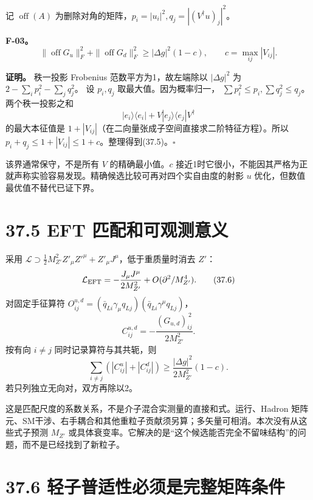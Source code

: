 \documentclass[
  11pt,
  oneside]{book}
\begin{document}
记 \(\operatorname{off}(A)\)
为删除对角的矩阵，\(p_i=|u_i|^2,q_j=|(V^\dagger u)_j|^2\)。

\protect\hypertarget{f-03}{}{}

\textbf{F-03。} \[
\|\operatorname{off}G_u\|_F^2+
\|\operatorname{off}G_d\|_F^2
\ge |\Delta g|^2(1-c),\qquad c=\max_{ij}|V_{ij}|.
\tag{37.5}
\]

\textbf{证明。} 秩一投影 Frobenius 范数平方为1，故左端除以
\(|\Delta g|^2\) 为 \(2-\sum_i p_i^2-\sum_jq_j^2\)。 设 \(p_i,q_j\)
取最大值。因为概率归一， \(\sum p_i^2\le p_i,\sum q_j^2\le q_j\)。
两个秩一投影之和 \[
|e_i\rangle\langle e_i|+
V|e_j\rangle\langle e_j|V^\dagger
\] 的最大本征值是
\(1+|V_{ij}|\)（在二向量张成子空间直接求二阶特征方程）。所以
\(p_i+q_j\le1+|V_{ij}|\le1+c\)。整理得到(37.5)。\(\square\)

该界通常保守，不是所有 \(V\) 的精确最小值。\(c\)
接近1时它很小，不能因其严格为正就声称实验容易发现。精确候选比较可再对四个实自由度的射影
\(u\) 优化，但数值最优值不替代已证下界。

\hypertarget{eft-ux5339ux914dux548cux53efux89c2ux6d4bux610fux4e49}{%
\section{37.5 EFT
匹配和可观测意义}\label{eft-ux5339ux914dux548cux53efux89c2ux6d4bux610fux4e49}}

采用
\(\mathcal L\supset \tfrac12M_{Z'}^2Z'_\mu Z'^\mu+Z'_\mu J^\mu\)，低于重质量时消去
\(Z'\)： \[
\mathcal L_{\rm EFT}=-\frac{J_\mu J^\mu}{2M_{Z'}^2}
+O(\partial^2/M_{Z'}^4).
\tag{37.6}
\] 对固定手征算符
\(O_{ij}^{u,d}=(\bar q_{Li}\gamma_\mu q_{Lj}) (\bar q_{Li}\gamma^\mu q_{Lj})\)，
\[
C_{ij}^{u,d}=-\frac{(G_{u,d})_{ij}^{\,2}}{2M_{Z'}^2}.
\tag{37.7}
\] 按有向 \(i\ne j\) 同时记录算符与其共轭，则 \[
\sum_{i\ne j}(|C_{ij}^u|+|C_{ij}^d|)
\ge\frac{|\Delta g|^2}{2M_{Z'}^2}(1-c).
\tag{37.8}
\] 若只列独立无向对，双方再除以2。

这是匹配尺度的系数关系，不是介子混合实测量的直接和式。运行、Hadron
矩阵元、SM干涉、右手耦合和其他重粒子贡献须另算；多矢量可相消。本次没有从这些式子预测
\(M_{Z'}\)
或具体衰变率。它解决的是``这个候选能否完全不留味结构''的问题，而不是已经找到了新粒子。

\hypertarget{ux8f7bux5b50ux666eux9002ux6027ux5fc5ux987bux662fux5b8cux6574ux77e9ux9635ux6761ux4ef6}{%
\section{37.6
轻子普适性必须是完整矩阵条件}\label{ux8f7bux5b50ux666eux9002ux6027ux5fc5ux987bux662fux5b8cux6574ux77e9ux9635ux6761ux4ef6}}
\end{document}
